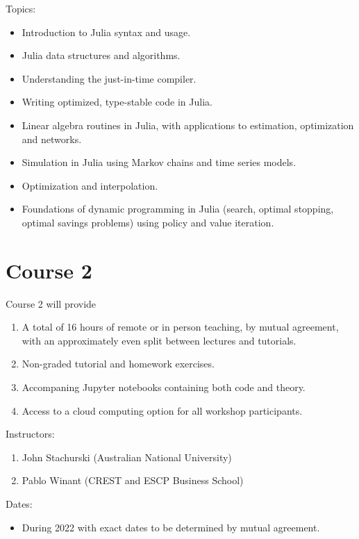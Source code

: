 \documentclass[12pt]{article}
\begin{document}
Topics:
%
\begin{itemize}
    \item Introduction to Julia syntax and usage.
    \item Julia data structures and algorithms.
    \item Understanding the just-in-time compiler.
    \item Writing optimized, type-stable code in Julia.
    \item Linear algebra routines in Julia, with applications to estimation,
        optimization and networks.
    \item Simulation in Julia using Markov chains and time series models.
    \item Optimization and interpolation.
    \item Foundations of dynamic programming in Julia (search, optimal
        stopping, optimal savings problems) using policy and value iteration.
\end{itemize}

\section{Course 2}

Course 2 will provide 
%
\begin{enumerate}
    \item A total of 16 hours of remote or in person teaching, by mutual
        agreement, with an approximately even split between lectures and
        tutorials.
    \item Non-graded tutorial and homework exercises.
    \item Accompaning Jupyter notebooks containing both code and theory.
    \item Access to a cloud computing option for all workshop participants.
\end{enumerate}

Instructors:
%
\begin{enumerate}
    \item John Stachurski (Australian National University)
    \item Pablo Winant (CREST and ESCP Business School)
\end{enumerate}

Dates: 
%
\begin{itemize}
    \item During 2022 with exact dates to be determined by mutual agreement.
\end{itemize}
\end{document}
